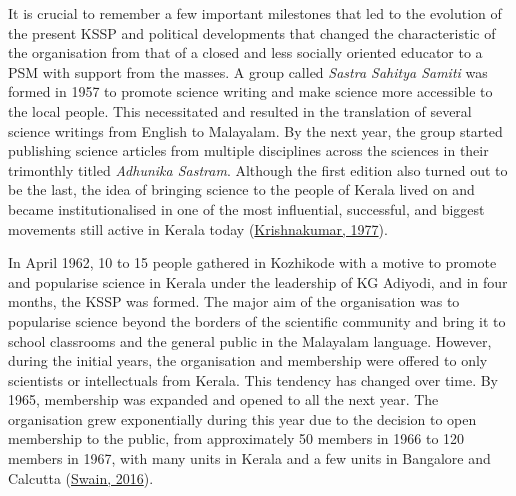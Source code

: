\documentclass[twoside, 13pt]{article}
\begin{document}
{{\fontsize{12}{14}\selectfont It is crucial to remember a few important milestones that led to the evolution of the present KSSP and political developments that changed the characteristic of the organisation from that of a closed and less socially oriented educator to a PSM with support from the masses. A group called \textit{Sastra Sahitya Samiti} was formed in 1957 to promote science writing and make science more accessible to the local people. This necessitated and resulted in the translation of several science writings from English to Malayalam. By the next year, the group started publishing science articles from multiple disciplines across the sciences in their trimonthly titled \textit{Adhunika Sastram}. Although the first edition also turned out to be the last, the idea of bringing science to the people of Kerala lived on and became institutionalised in one of the most influential, successful, and biggest movements still active in Kerala today (\underline{Krishnakumar, 1977}). 

\newpage

In April 1962, 10 to 15 people gathered in Kozhikode with a motive to promote and popularise science in Kerala under the leadership of KG Adiyodi, and in four months, the KSSP was formed. The major aim of the organisation was to popularise science beyond the borders of the scientific community and bring it to school classrooms and the general public in the Malayalam language. However, during the initial years, the organisation and membership were offered to only scientists or intellectuals from Kerala. This tendency has changed over time. By 1965, membership was expanded and opened to all the next year. The organisation grew exponentially during this year due to the decision to open membership to the public, from approximately 50 members in 1966 to 120 members in 1967, with many units in Kerala and a few units in Bangalore and Calcutta (\underline{Swain, 2016}). 

}}
\end{document}
